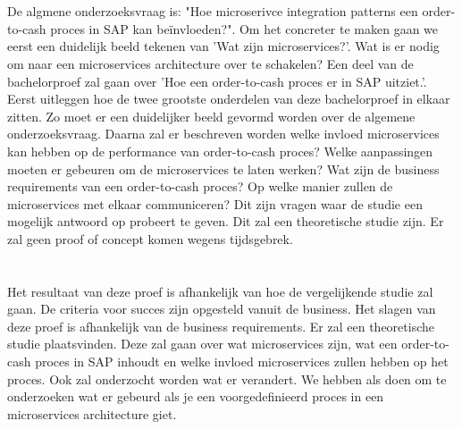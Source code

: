 \section{}
\label{sec:onderzoeksvraag}
De algmene onderzoeksvraag is: "Hoe microserivce integration patterns een order-to-cash proces in SAP kan beïnvloeden?". Om het concreter te maken gaan we eerst een duidelijk beeld tekenen van 'Wat zijn microservices?'. Wat is er nodig om naar een microservices architecture over te schakelen? Een deel van de bachelorproef zal gaan over 'Hoe een order-to-cash proces er in SAP uitziet.'. Eerst uitleggen hoe de twee grootste onderdelen van deze bachelorproef in elkaar zitten. Zo moet er een duidelijker beeld gevormd worden over de algemene onderzoeksvraag. Daarna zal er beschreven worden welke invloed  microservices kan hebben op de performance van order-to-cash proces? Welke aanpassingen moeten er gebeuren om de microservices te laten werken? Wat zijn de business requirements van een order-to-cash proces? Op welke manier zullen de microservices met elkaar communiceren? Dit zijn vragen waar de studie een mogelijk antwoord op probeert te geven. Dit zal een theoretische studie zijn. Er zal geen proof of concept komen wegens tijdsgebrek. 

\section{}
\label{sec:onderzoeksdoelstelling}
Het resultaat van deze proef is afhankelijk van hoe de vergelijkende studie zal gaan. De criteria voor succes zijn opgesteld vanuit de business. Het slagen van deze proef is afhankelijk van de business requirements. Er zal een theoretische studie plaatsvinden. Deze zal gaan over wat microservices zijn, wat een order-to-cash proces in SAP inhoudt en welke invloed microservices zullen hebben op het proces. Ook zal onderzocht worden wat er verandert. We hebben als doen om te onderzoeken wat er gebeurd als je een voorgedefinieerd proces in een microservices architecture giet.

\section{}
\label{sec:opzet-bachelorproef}


